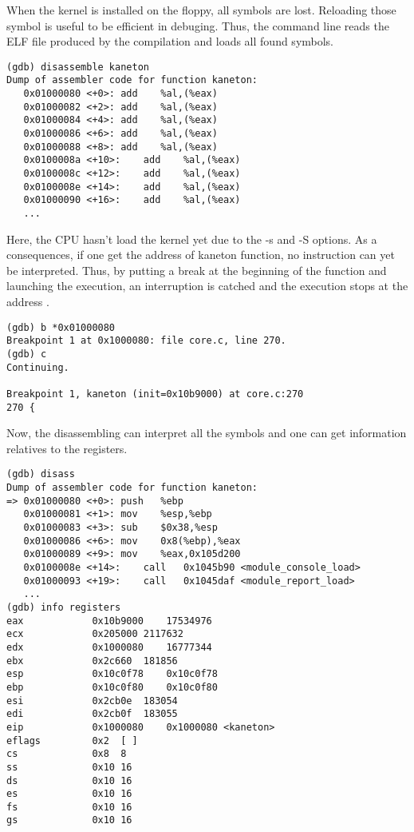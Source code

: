When the kernel is installed on the floppy, all symbols are lost. Reloading those symbol is useful to be efficient in debuging. Thus, the command line  reads the ELF file produced by the compilation and loads all found symbols.

\begin{verbatim}
(gdb) disassemble kaneton
Dump of assembler code for function kaneton:
   0x01000080 <+0>:	add    %al,(%eax)
   0x01000082 <+2>:	add    %al,(%eax)
   0x01000084 <+4>:	add    %al,(%eax)
   0x01000086 <+6>:	add    %al,(%eax)
   0x01000088 <+8>:	add    %al,(%eax)
   0x0100008a <+10>:	add    %al,(%eax)
   0x0100008c <+12>:	add    %al,(%eax)
   0x0100008e <+14>:	add    %al,(%eax)
   0x01000090 <+16>:	add    %al,(%eax)
   ...
\end{verbatim}
Here, the CPU hasn't load the kernel yet due to the -s and -S options. As a consequences, if one get the address of kaneton function, no instruction can yet be interpreted. Thus, by putting a break at the beginning of the function and launching the execution, an interruption is catched and the execution stops at the address .

\begin{verbatim}
(gdb) b *0x01000080
Breakpoint 1 at 0x1000080: file core.c, line 270.
(gdb) c
Continuing.

Breakpoint 1, kaneton (init=0x10b9000) at core.c:270
270	{
\end{verbatim}

Now, the disassembling can interpret all the symbols and one can get information relatives to the registers.

\begin{verbatim}
(gdb) disass
Dump of assembler code for function kaneton:
=> 0x01000080 <+0>:	push   %ebp
   0x01000081 <+1>:	mov    %esp,%ebp
   0x01000083 <+3>:	sub    $0x38,%esp
   0x01000086 <+6>:	mov    0x8(%ebp),%eax
   0x01000089 <+9>:	mov    %eax,0x105d200
   0x0100008e <+14>:	call   0x1045b90 <module_console_load>
   0x01000093 <+19>:	call   0x1045daf <module_report_load>
   ...
(gdb) info registers
eax            0x10b9000	17534976
ecx            0x205000	2117632
edx            0x1000080	16777344
ebx            0x2c660	181856
esp            0x10c0f78	0x10c0f78
ebp            0x10c0f80	0x10c0f80
esi            0x2cb0e	183054
edi            0x2cb0f	183055
eip            0x1000080	0x1000080 <kaneton>
eflags         0x2	[ ]
cs             0x8	8
ss             0x10	16
ds             0x10	16
es             0x10	16
fs             0x10	16
gs             0x10	16
\end{verbatim}
